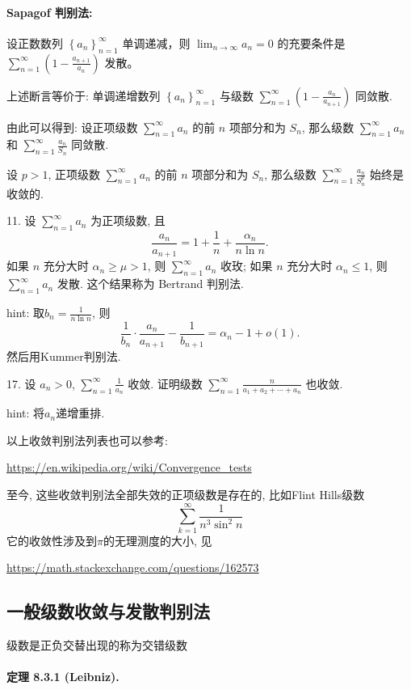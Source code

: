 \paragraph{Sapagof 判别法: }

设正数数列 $\left\{ a_{n}\right\} _{n=1}^{\infty}$ 单调递减，则 $\lim_{n\rightarrow\infty}a_{n}=0$
的充要条件是 $\sum_{n=1}^{\infty}\left(1-\frac{a_{n+1}}{a_{n}}\right)$
发散。 

上述断言等价于: 单调递增数列 $\left\{ a_{n}\right\} _{n=1}^{\infty}$ 与级数 $\sum_{n=1}^{\infty}\left(1-\frac{a_{n}}{a_{n+1}}\right)$
同敛散.

由此可以得到: 设正项级数 $\sum_{n=1}^{\infty}a_{n}$ 的前 $n$ 项部分和为 $S_{n}$,
那么级数 $\sum_{n=1}^{\infty}a_{n}$ 和 $\sum_{n=1}^{\infty}\frac{a_{n}}{S_{n}}$
同敛散. 

设 $p>1$, 正项级数 $\sum_{n=1}^{\infty}a_{n}$ 的前 $n$ 项部分和为 $S_{n}$,
那么级数 $\sum_{n=1}^{\infty}\frac{a_{n}}{S_{n}^{p}}$ 始终是收敛的.

11. 设 $\sum_{n=1}^{\infty}a_{n}$ 为正项级数, 且 
\[
\frac{a_{n}}{a_{n+1}}=1+\frac{1}{n}+\frac{\alpha_{n}}{n\ln n}.
\]
如果 $n$ 充分大时 $\alpha_{n}\geqslant\mu>1$, 则 $\sum_{n=1}^{\infty}a_{n}$
收玫; 如果 $n$ 充分大时 $\alpha_{n}\leqslant1$, 则 $\sum_{n=1}^{\infty}a_{n}$
发散. 这个结果称为 Bertrand 判别法.

hint: 取\textbf{$b_{n}=\frac{1}{n\ln n}$}, 则
\[
\frac{1}{b_{n}}\cdot\frac{a_{n}}{a_{n+1}}-\frac{1}{b_{n+1}}=\alpha_{n}-1+o(1).
\]
然后用Kummer判别法.

17. 设 $a_{n}>0$, $\sum_{n=1}^{\infty}\frac{1}{a_{n}}$ 收敛. 证明级数 $\sum_{n=1}^{\infty}\frac{n}{a_{1}+a_{2}+\cdots+a_{n}}$
也收敛.

hint: 将$a_{n}$递增重排.

以上收敛判别法列表也可以参考:

\url{https://en.wikipedia.org/wiki/Convergence_tests}

至今, 这些收敛判别法全部失效的正项级数是存在的, 比如Flint Hills级数
\[
\sum_{k=1}^{\infty}\frac{1}{n^{3}\sin^{2}n}
\]
它的收敛性涉及到$\pi$的无理测度的大小, 见

\url{https://math.stackexchange.com/questions/162573}

\subsection{一般级数收敛与发散判别法}

级数是正负交替出现的称为交错级数

\paragraph{定理 8.3.1 (Leibniz). }

